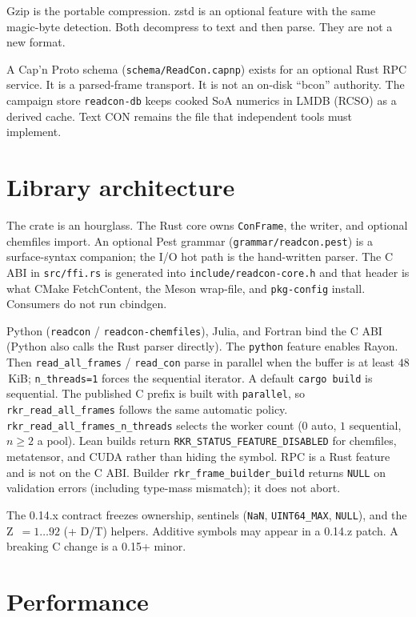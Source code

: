 \documentclass[preprint,12pt]{elsarticle}
\begin{document}
Gzip is the portable compression. zstd is an optional feature with
the same magic-byte detection. Both decompress to text and then
parse. They are not a new format.

A Cap'n Proto schema (\texttt{schema/ReadCon.capnp}) exists for an
optional Rust RPC service. It is a parsed-frame transport. It is not
an on-disk ``bcon'' authority. The campaign store
\texttt{readcon-db} keeps cooked SoA numerics in LMDB (RCSO) as a
derived cache. Text CON remains the file that independent tools must
implement.

\section{Library architecture}

The crate is an hourglass. The Rust core owns \texttt{ConFrame}, the
writer, and optional chemfiles import. An optional Pest grammar
(\texttt{grammar/readcon.pest}) is a surface-syntax companion; the
I/O hot path is the hand-written parser. The C ABI in
\texttt{src/ffi.rs} is generated into \texttt{include/readcon-core.h}
and that header is what CMake FetchContent, the Meson wrap-file, and
\texttt{pkg-config} install. Consumers do not run cbindgen.

Python (\texttt{readcon} / \texttt{readcon-chemfiles}), Julia, and
Fortran bind the C ABI (Python also calls the Rust parser directly).
The \texttt{python} feature enables Rayon. Then
\texttt{read\_all\_frames} / \texttt{read\_con} parse in parallel
when the buffer is at least $48$\,KiB; \texttt{n\_threads=1} forces
the sequential iterator. A default \texttt{cargo build} is
sequential. The published C prefix is built with \texttt{parallel},
so \texttt{rkr\_read\_all\_frames} follows the same automatic
policy. \texttt{rkr\_read\_all\_frames\_n\_threads} selects the
worker count ($0$ auto, $1$ sequential, $n\geq 2$ a pool). Lean
builds return \texttt{RKR\_STATUS\_FEATURE\_DISABLED} for
chemfiles, metatensor, and CUDA rather than hiding the symbol. RPC
is a Rust feature and is not on the C ABI. Builder
\texttt{rkr\_frame\_builder\_build} returns \texttt{NULL} on
validation errors (including type-mass mismatch); it does not abort.

The 0.14.x contract freezes ownership, sentinels (\texttt{NaN},
\texttt{UINT64\_MAX}, \texttt{NULL}), and the Z~$=1\ldots 92$ (+ D/T)
helpers. Additive symbols may appear in a 0.14.z patch. A breaking C
change is a 0.15+ minor.

\section{Performance}
\end{document}
